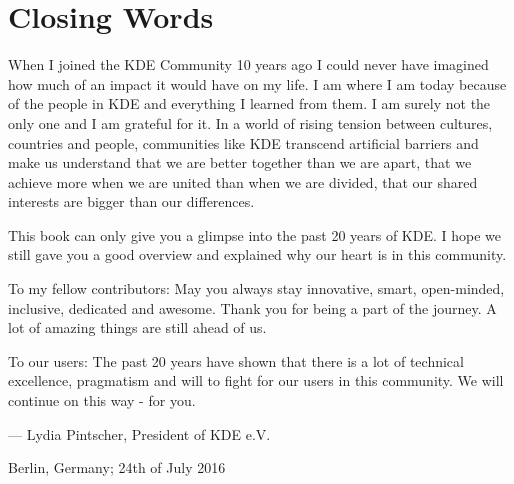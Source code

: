 \chapter*{Closing Words}

When I joined the KDE Community 10 years ago I could never have imagined how much of an impact it would have on my life. I am where I am today because of the people in KDE and everything I learned from them. I am surely not the only one and I am grateful for it. In a world of rising tension between cultures, countries and people, communities like KDE transcend artificial barriers and make us understand that we are better together than we are apart, that we achieve more when we are united than when we are divided, that our shared interests are bigger than our differences.

This book can only give you a glimpse into the past 20 years of KDE. I hope we still gave you a good overview and explained why our heart is in this community.

To my fellow contributors: May you always stay innovative, smart, open-minded, inclusive, dedicated and awesome. Thank you for being a part of the journey. A lot of amazing things are still ahead of us.

To our users: The past 20 years have shown that there is a lot of technical excellence, pragmatism and will to fight for our users in this community. We will continue on this way - for you.

\begin{flushright}--- Lydia Pintscher, President of KDE e.V.\end{flushright}
\begin{flushright}Berlin, Germany; 24th of July 2016\end{flushright}
